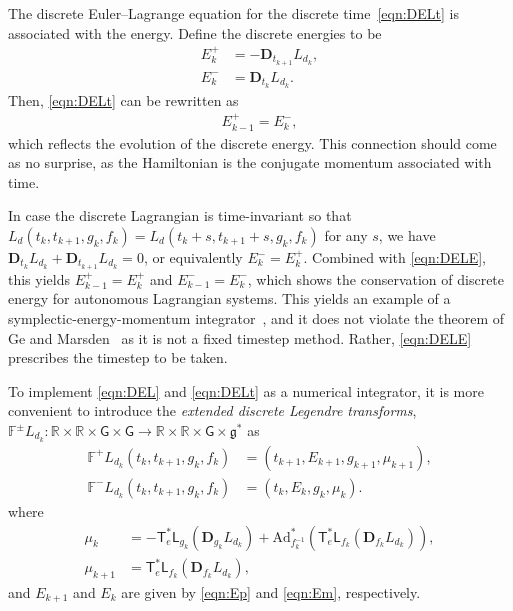 \documentclass[letterpaper, 10pt, conference]{ieeeconf}
\newcommand{\G}{\ensuremath{\mathsf{G}}}
\newcommand{\T}{\ensuremath{\mathsf{T}}}
\renewcommand{\L}{\ensuremath{\mathsf{L}}}
\renewcommand{\Re}{\ensuremath{\mathbb{R}}}
\newcommand{\D}{\ensuremath{\mathbf{D}}}
\newcommand{\Ad}{\ensuremath{\mathrm{Ad}}}
\newcommand{\g}{\ensuremath{\mathfrak{g}}}
\begin{document}
The discrete Euler--Lagrange equation for the discrete time~\eqref{eqn:DELt} is associated with the energy.
Define the discrete energies to be
\begin{align}
    E^+_k &= - \D_{t_{k+1}} L_{d_k},\label{eqn:Ep}\\
    E^-_k &= \D_{t_{k}} L_{d_k}.\label{eqn:Em}
\end{align}
Then, \eqref{eqn:DELt} can be rewritten as
\begin{align}
    E^+_{k-1} = E^-_k,\label{eqn:DELE}
\end{align}
which reflects the evolution of the discrete energy. This connection should come as no surprise, as the Hamiltonian is the conjugate momentum associated with time.

In case the discrete Lagrangian is time-invariant so that $L_d(t_k,t_{k+1},g_k,f_k) =  L_d(t_k+s,t_{k+1}+s,g_k,f_k)$ for any $s$, 
we have $\D_{t_k}L_{d_k} + \D_{t_{k+1}}L_{d_k}=0$, or equivalently $E^-_k = E^+_k$. 
Combined with \eqref{eqn:DELE}, this yields $E_{k-1}^+ = E_k^+$ and $E_{k-1}^-=E_k^-$, which shows the conservation of discrete energy for autonomous Lagrangian systems. This yields an example of a  symplectic-energy-momentum integrator~\cite{KaMaOr1999}, and it does not violate the theorem of Ge and Marsden~\cite{GeMa1988} as it is not a fixed timestep method. Rather, \eqref{eqn:DELE} prescribes the timestep to be taken.

To implement \eqref{eqn:DEL} and \eqref{eqn:DELt} as a numerical integrator, it is more convenient to introduce the \textit{extended discrete Legendre transforms}, $\mathbb{F}^\pm L_{d_k}: \Re\times\Re \times \G \times \G \rightarrow \Re\times \Re\times\G\times\g^*$ as
\begin{align}
    \mathbb{F}^+ L_{d_k} (t_k,t_{k+1}, g_k,f_k) & = (t_{k+1}, E_{k+1}, g_{k+1}, \mu_{k+1}),\\
    \mathbb{F}^- L_{d_k} (t_k,t_{k+1}, g_k,f_k) & = (t_k, E_k, g_{k}, \mu_{k}).
\end{align}
where
\begin{align}
    \mu_k & = -\T^*_e\L_{g_k}(\D_{g_k} L_{d_k})+ \Ad^*_{f_k^{-1}} (\T^*_e\L_{f_k}(\D_{f_k} L_{d_k})),\label{eqn:muk}\\
    \mu_{k+1} & = \T^*_e\L_{f_k} (\D_{f_k} L_{d_k}),\label{eqn:mukp}
\end{align}
and $E_{k+1}$ and $E_k$ are given by \eqref{eqn:Ep} and \eqref{eqn:Em}, respectively. 
\end{document}
